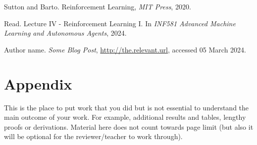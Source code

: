 \documentclass[journal, a4paper]{IEEEtran}
\begin{document}
\begin{thebibliography}{4}

	Sutton and Barto. Reinforcement Learning,
	{\em MIT Press}, 2020.

		Read. Lecture IV - Reinforcement Learning I. In \textit{INF581 Advanced Machine Learning and Autonomous Agents}, 2024.

		Author name. \textit{Some Blog Post}, \url{http://the.relevant.url}, accessed 05 March 2024.
\end{thebibliography}

\newpage
\section*{Appendix}
This is the place to put work that you did but is not essential to understand the main outcome of your work. For example, additional results and tables, lengthy proofs or derivations. Material here does not count towards page limit (but also it will be optional for the reviewer/teacher to work through). 
\end{document}
